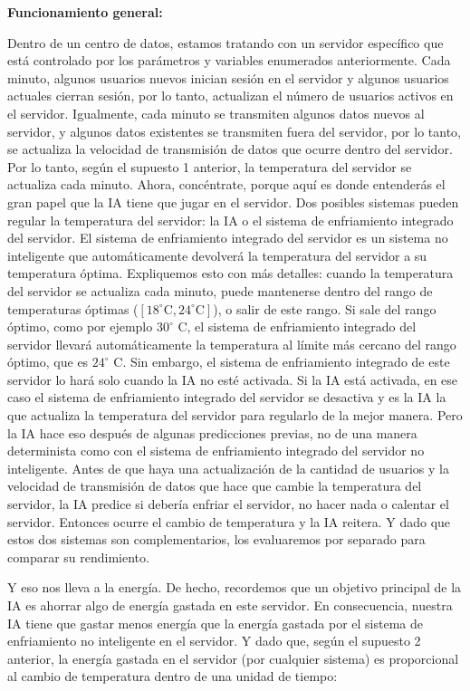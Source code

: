 \documentclass[
]{book}
\begin{document}
\textbf{Funcionamiento general:}

Dentro de un centro de datos, estamos tratando con un servidor específico que está controlado por los parámetros y variables enumerados anteriormente. Cada minuto, algunos usuarios nuevos inician sesión en el servidor y algunos usuarios actuales cierran sesión, por lo tanto, actualizan el número de usuarios activos en el servidor. Igualmente, cada minuto se transmiten algunos datos nuevos al servidor, y algunos datos existentes se transmiten fuera del servidor, por lo tanto, se actualiza la velocidad de transmisión de datos que ocurre dentro del servidor. Por lo tanto, según el supuesto 1 anterior, la temperatura del servidor se actualiza cada minuto. Ahora, concéntrate, porque aquí es donde entenderás el gran papel que la IA tiene que jugar en el servidor. Dos posibles sistemas pueden regular la temperatura del servidor: la IA o el sistema de enfriamiento integrado del servidor. El sistema de enfriamiento integrado del servidor es un sistema no inteligente que automáticamente devolverá la temperatura del servidor a su temperatura óptima. Expliquemos esto con más detalles: cuando la temperatura del servidor se actualiza cada minuto, puede mantenerse dentro del rango de temperaturas óptimas (\([18^{\circ} \textrm{C}, 24^{\circ} \textrm{C}]\)), o salir de este rango. Si sale del rango óptimo, como por ejemplo \(30^{\circ}\) C, el sistema de enfriamiento integrado del servidor llevará automáticamente la temperatura al límite más cercano del rango óptimo, que es \(24^{\circ}\) C. Sin embargo, el sistema de enfriamiento integrado de este servidor lo hará solo cuando la IA no esté activada. Si la IA está activada, en ese caso el sistema de enfriamiento integrado del servidor se desactiva y es la IA la que actualiza la temperatura del servidor para regularlo de la mejor manera. Pero la IA hace eso después de algunas predicciones previas, no de una manera determinista como con el sistema de enfriamiento integrado del servidor no inteligente. Antes de que haya una actualización de la cantidad de usuarios y la velocidad de transmisión de datos que hace que cambie la temperatura del servidor, la IA predice si debería enfriar el servidor, no hacer nada o calentar el servidor. Entonces ocurre el cambio de temperatura y la IA reitera. Y dado que estos dos sistemas son complementarios, los evaluaremos por separado para comparar su rendimiento.

Y eso nos lleva a la energía. De hecho, recordemos que un objetivo principal de la IA es ahorrar algo de energía gastada en este servidor. En consecuencia, nuestra IA tiene que gastar menos energía que la energía gastada por el sistema de enfriamiento no inteligente en el servidor. Y dado que, según el supuesto 2 anterior, la energía gastada en el servidor (por cualquier sistema) es proporcional al cambio de temperatura dentro de una unidad de tiempo:
\end{document}
